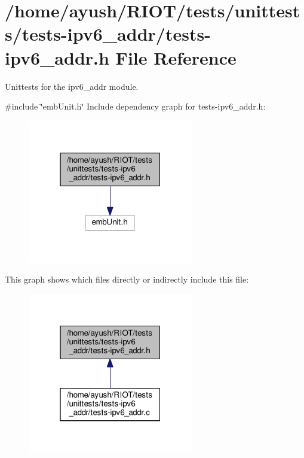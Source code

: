 \hypertarget{tests-ipv6__addr_8h}{}\section{/home/ayush/\+R\+I\+O\+T/tests/unittests/tests-\/ipv6\+\_\+addr/tests-\/ipv6\+\_\+addr.h File Reference}
\label{tests-ipv6__addr_8h}


Unittests for the {\ttfamily ipv6\+\_\+addr} module.  


{\ttfamily \#include \char`\"{}emb\+Unit.\+h\char`\"{}}\newline
Include dependency graph for tests-\/ipv6\+\_\+addr.h\+:
\nopagebreak
\begin{figure}[H]
\begin{center}
\leavevmode
\includegraphics[width=205pt]{tests-ipv6__addr_8h__incl}
\end{center}
\end{figure}
This graph shows which files directly or indirectly include this file\+:
\nopagebreak
\begin{figure}[H]
\begin{center}
\leavevmode
\includegraphics[width=205pt]{tests-ipv6__addr_8h__dep__incl}
\end{center}
\end{figure}
